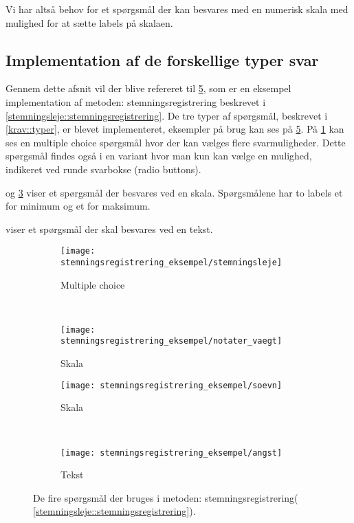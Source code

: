 Vi har altså behov for et spørgsmål der kan besvares med en numerisk skala med mulighed for at sætte labels på skalaen.

\subsection{Implementation af de forskellige typer svar}
Gennem dette afsnit vil der blive refereret til \cref{stemreg::spoergsmaal}, som er en eksempel implementation af metoden: stemningsregistrering beskrevet i \cref{stemningsleje::stemningsregistrering}.
De tre typer af spørgsmål, beskrevet i \cref{krav::typer}, er blevet implementeret, eksempler på brug kan ses på \cref{stemreg::spoergsmaal}.
På \cref{stemreg::stemningsleje} kan ses en multiple choice spørgsmål hvor der kan vælges flere svarmuligheder.
Dette spørgsmål findes også i en variant hvor man kun kan vælge en mulighed, indikeret ved runde svarbokse (radio buttons).

 og \cref{stemreg::soevn} viser et spørgsmål der besvares ved en skala. 
Spørgsmålene har to labels et for minimum og et for maksimum.

 viser et spørgsmål der skal besvares ved en tekst. 


\begin{figure}
	\centering
	\begin{subfigure}[b]{0.45\textwidth}
		\texttt{[image: stemningsregistrering\_eksempel/stemningsleje]}
		\caption{Multiple choice}\label{stemreg::stemningsleje}
	\end{subfigure}
	~
	\begin{subfigure}[b]{0.45\textwidth}
		\texttt{[image: stemningsregistrering\_eksempel/notater\_vaegt]}
		\caption{Skala}\label{stemreg::angst}
	\end{subfigure}
	\newline
	\begin{subfigure}[b]{0.45\textwidth}
		\texttt{[image: stemningsregistrering\_eksempel/soevn]}
		\caption{Skala}\label{stemreg::soevn}
	\end{subfigure}
	~
	\begin{subfigure}[b]{0.45\textwidth}
		\texttt{[image: stemningsregistrering\_eksempel/angst]}
		\caption{Tekst}\label{stemreg::notater_vaegt}
	\end{subfigure}
	\caption{De fire spørgsmål der bruges i metoden: stemningsregistrering( \cref{stemningsleje::stemningsregistrering}).}\label{stemreg::spoergsmaal}
\end{figure}

